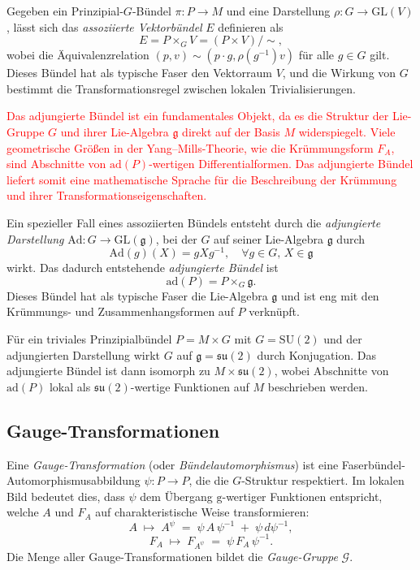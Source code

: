 \documentclass[10pt, letterpaper]{article}
\newcommand{\entwurf}[1]{\textcolor{red}{#1}}
\begin{document}
\begin{definition}
Gegeben ein Prinzipial-\(G\)-Bündel \(\pi: P \to M\) und eine Darstellung \(\rho: G \to \mathrm{GL}(V)\), lässt sich das \emph{assoziierte Vektorbündel} \(E\) definieren als
\[
E = P \times_G V = (P \times V) / \sim,
\]
wobei die Äquivalenzrelation \((p, v) \sim (p \cdot g, \rho(g^{-1}) v)\) für alle \(g \in G\) gilt. Dieses Bündel hat als typische Faser den Vektorraum \(V\), und die Wirkung von \(G\) bestimmt die Transformationsregel zwischen lokalen Trivialisierungen.
\end{definition}


\entwurf{Das adjungierte Bündel ist ein fundamentales Objekt, da es die Struktur der Lie-Gruppe \(G\) und ihrer Lie-Algebra \(\mathfrak{g}\) direkt auf der Basis \(M\) widerspiegelt. Viele geometrische Größen in der Yang--Mills-Theorie, wie die Krümmungsform \(F_A\), sind Abschnitte von \(\mathrm{ad}(P)\)-wertigen Differentialformen. Das adjungierte Bündel liefert somit eine mathematische Sprache für die Beschreibung der Krümmung und ihrer Transformationseigenschaften.}

\begin{definition}
Ein spezieller Fall eines assoziierten Bündels entsteht durch die \emph{adjungierte Darstellung} \(\mathrm{Ad}: G \to \mathrm{GL}(\mathfrak{g})\), bei der \(G\) auf seiner Lie-Algebra \(\mathfrak{g}\) durch
\[
\mathrm{Ad}(g)(X) = g X g^{-1}, \quad \forall g \in G, \, X \in \mathfrak{g}
\]
wirkt. Das dadurch entstehende \emph{adjungierte Bündel} ist
\[
\mathrm{ad}(P) = P \times_G \mathfrak{g}.
\]
Dieses Bündel hat als typische Faser die Lie-Algebra \(\mathfrak{g}\) und ist eng mit den Krümmungs- und Zusammenhangsformen auf \(P\) verknüpft.
\end{definition}

\begin{example}
Für ein triviales Prinzipialbündel \(P = M \times G\) mit \(G = \mathrm{SU}(2)\) und der adjungierten Darstellung wirkt \(G\) auf \(\mathfrak{g} = \mathfrak{su}(2)\) durch Konjugation. Das adjungierte Bündel ist dann isomorph zu \(M \times \mathfrak{su}(2)\), wobei Abschnitte von \(\mathrm{ad}(P)\) lokal als \(\mathfrak{su}(2)\)-wertige Funktionen auf \(M\) beschrieben werden.
\end{example}




\subsection{Gauge-Transformationen}
Eine \emph{Gauge-Transformation} (oder \emph{Bündelautomorphismus}) ist eine Faserbündel-Automorphismusabbildung \(\psi: P \to P\), die die \(G\)-Struktur respektiert.  
Im lokalen Bild bedeutet dies, dass \(\psi\) dem Übergang \(\mathrm{g}\)-wertiger Funktionen entspricht, welche \(A\) und \(F_A\) auf charakteristische Weise transformieren:
\[
A \;\mapsto\; A^\psi \;=\; \psi\,A\,\psi^{-1} \;+\; \psi\,d\psi^{-1},
\]
\[
F_A \;\mapsto\; F_{A^\psi} \;=\; \psi\,F_A\,\psi^{-1}.
\]
Die Menge aller Gauge-Transformationen bildet die \emph{Gauge-Gruppe} \(\mathcal{G}\).
\end{document}
